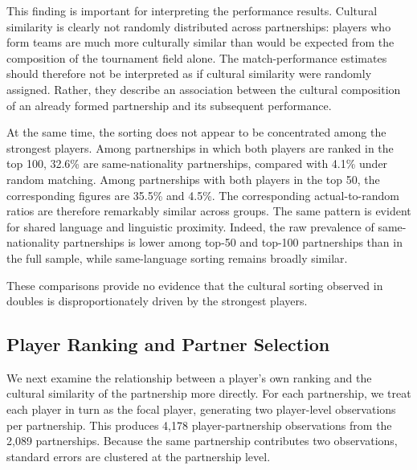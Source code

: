 \documentclass[10pt]{article}
\begin{document}
This finding is important for interpreting the performance results. Cultural similarity is clearly not randomly distributed across partnerships: players who form teams are much more culturally similar than would be expected from the composition of the tournament field alone. The match-performance estimates should therefore not be interpreted as if cultural similarity were randomly assigned. Rather, they describe an association between the cultural composition of an already formed partnership and its subsequent performance.

At the same time, the sorting does not appear to be concentrated among the strongest players. Among partnerships in which both players are ranked in the top 100, 32.6\% are same-nationality partnerships, compared with 4.1\% under random matching. Among partnerships with both players in the top 50, the corresponding figures are 35.5\% and 4.5\%. The corresponding actual-to-random ratios are therefore remarkably similar across groups. The same pattern is evident for shared language and linguistic proximity. Indeed, the raw prevalence of same-nationality partnerships is lower among top-50 and top-100 partnerships than in the full sample, while same-language sorting remains broadly similar.

These comparisons provide no evidence that the cultural sorting observed in doubles is disproportionately driven by the strongest players.

\subsection{Player Ranking and Partner Selection}

We next examine the relationship between a player's own ranking and the cultural similarity of the partnership more directly. For each partnership, we treat each player in turn as the focal player, generating two player-level observations per partnership. This produces 4,178 player-partnership observations from the 2,089 partnerships. Because the same partnership contributes two observations, standard errors are clustered at the partnership level.
\end{document}
